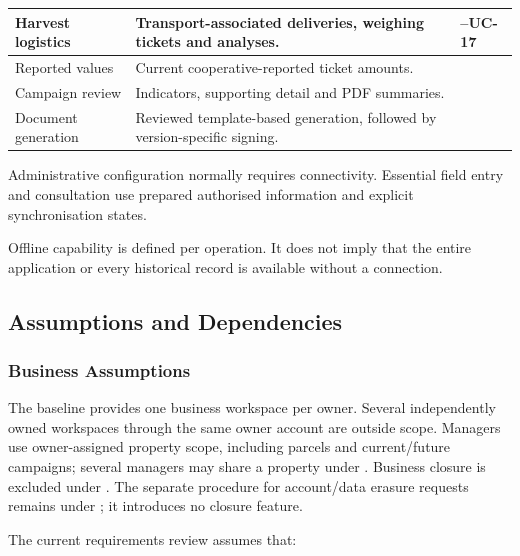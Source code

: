 {\begin{longtable}{L{0.28}L{0.54}L{0.18}}
        Harvest logistics
        & Transport-associated deliveries,
        weighing tickets and analyses.
        & --UC-17
        \\
\midrule

        Reported values
        & Current cooperative-reported
        ticket amounts.
        & 
        \\
\midrule

        Campaign review
        & Indicators, supporting detail
        and PDF summaries.
        & 
        \\
\midrule

        Document generation
        & Reviewed template-based generation, followed by version-specific signing.
        & 
        \\

    \end{longtable}
}

Administrative configuration normally requires
connectivity.
Essential field entry and consultation
use prepared authorised information
and explicit synchronisation states.

Offline capability is defined per operation.
It does not imply that the entire application
or every historical record is available
without a connection.

\subsection{Assumptions and Dependencies}

\subsubsection{Business Assumptions}

The baseline provides one business workspace per owner. Several independently
owned workspaces through the same owner account are outside scope. Managers use
owner-assigned property scope, including parcels and current/future campaigns;
several managers may share a property under . Business closure
is excluded under . The separate procedure for account/data
erasure requests remains under ; it introduces no closure feature.

The current requirements review assumes that:

